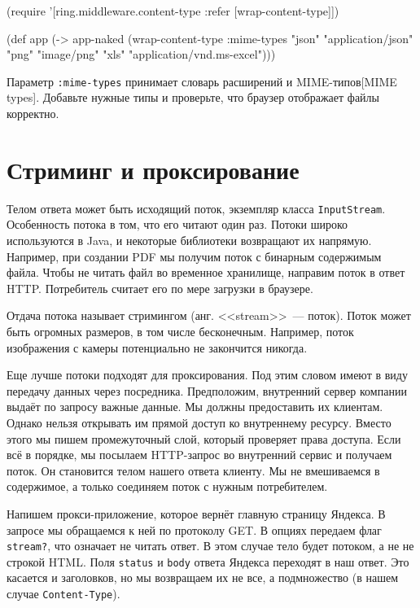 \begin{english}
  \begin{clojure}
(require '[ring.middleware.content-type
           :refer [wrap-content-type]])

(def app
  (-> app-naked
      (wrap-content-type
       {:mime-types {"json" "application/json"
                      "png" "image/png"
                      "xls" "application/vnd.ms-excel"}})))
  \end{clojure}
\end{english}

Параметр \verb|:mime-types| принимает словарь расширений и
MIME-типов[MIME types]. Добавьте нужные типы и
проверьте, что браузер отображает файлы корректно.


\section{Стриминг и проксирование}

Телом ответа может быть исходящий поток, экземпляр класса
\verb|InputStream|. Особенность потока в том, что его читают один раз. Потоки
широко используются в Java, и некоторые библиотеки возвращают их
напрямую. Например, при создании PDF мы получим поток с бинарным содержимым
файла. Чтобы не читать файл во временное хранилище, направим поток в ответ
HTTP. Потребитель считает его по мере загрузки в браузере.

Отдача потока называет стримингом (анг. <<stream>>~--- поток). Поток может быть
огромных размеров, в том числе бесконечным. Например, поток изображения с камеры
потенциально не закончится никогда.

Еще лучше потоки подходят для проксирования. Под этим словом имеют в виду
передачу данных через посредника. Предположим, внутренний сервер компании
выдаёт по запросу важные данные. Мы должны предоставить их клиентам. Однако
нельзя открывать им прямой доступ ко внутреннему ресурсу. Вместо этого мы пишем
промежуточный слой, который проверяет права доступа. Если всё в порядке, мы
посылаем HTTP-запрос во внутренний сервис и получаем поток. Он становится телом
нашего ответа клиенту. Мы не вмешиваемся в содержимое, а только соединяем поток с
нужным потребителем.

Напишем прокси-приложение, которое вернёт главную страницу Яндекса. В
запросе мы обращаемся к ней по протоколу GET. В опциях передаем флаг
\verb|stream?|, что означает не читать ответ. В этом случае тело будет
потоком, а не не строкой HTML. Поля \verb|status| и \verb|body| ответа
Яндекса переходят в наш ответ. Это касается и заголовков, но мы возвращаем их не
все, а подмножество (в нашем случае \verb|Content-Type|).

